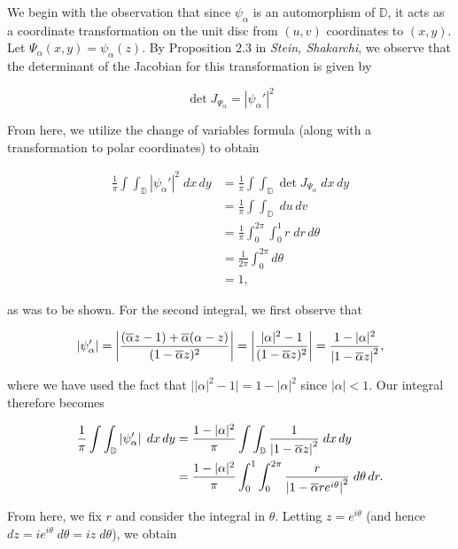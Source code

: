 \begin{solution}
  We begin with the observation that since $\psi_{\alpha}$ is an automorphism of $\mathbb{D}$, it acts as a coordinate
  transformation on the unit disc from $(u, v)$ coordinates to $(x, y)$. Let $\Psi_{\alpha}(x, y) = \psi_{\alpha}(z)$. By 
  Proposition 2.3 in \textit{Stein, Shakarchi}, we observe that the determinant of the Jacobian for this transformation 
  is given by 
  
  $$\det{J_{\Psi_{\alpha}}} = |\psi_{\alpha}'|^2$$

  From here, we utilize the change of variables formula (along with a transformation to polar coordinates) to obtain

  \begin{align*}
    \frac{1}{\pi} \int\int_{\mathbb{D}} \left| \psi_{\alpha}' \right|^2 \; dx \, dy 
      &= \frac{1}{\pi} \int\int_{\mathbb{D}} \det{J_{\Psi_{\alpha}}} \; dx \, dy \\
      &= \frac{1}{\pi} \int\int_{\mathbb{D}} \; du \, dv \\
      &= \frac{1}{\pi} \int_0^{2 \pi}\int_0^1 r \; dr \, d\theta \\
      &= \frac{1}{2 \pi} \int_0^{2 \pi} d\theta \\
      &= 1,
  \end{align*}

  as was to be shown. For the second integral, we first observe that

  $$
  \left|\psi'_{\alpha}\right| = \left|\frac{(\overline{\alpha} z - 1) + \overline{\alpha}(\alpha - z)}{(1 - \overline{\alpha}z)^2}\right|
                              = \left| \frac{|\alpha|^2 - 1}{(1 - \overline{\alpha}z)^2} \right|
                              = \frac{1 - |\alpha|^2}{\left|1 - \overline{\alpha}z\right|^2},
  $$

  where we have used the fact that $\big\vert |\alpha|^2 - 1 \big\vert = 1 - |\alpha|^2$ since $|\alpha| < 1$. Our integral
  therefore becomes

  \begin{align*}
    \frac{1}{\pi} \int\int_{\mathbb{D}} \left| \psi_{\alpha}' \right| \; dx \, dy 
      &= \frac{1 - |\alpha|^2}{\pi} \int\int_{\mathbb{D}} \frac{1}{\left|1 - \overline{\alpha}z\right|^2} \; dx \, dy \\
      &= \frac{1 - |\alpha|^2}{\pi} \int_0^1 \int_0^{2 \pi}  \frac{r}{\left|1 - \overline{\alpha}re^{i\theta}\right|^2} \; d\theta \, dr.
  \end{align*}

  From here, we fix $r$ and consider the integral in $\theta$. Letting $z = e^{i \theta}$ (and hence 
  $dz = i e^{i \theta} \; d\theta = i z \; d\theta$), we obtain


\end{solution}
